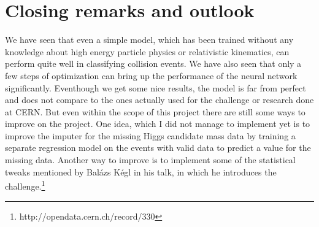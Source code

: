 \section{Closing remarks and outlook}\label{sec:outlook}

We have seen that even a simple model, which has been trained without any knowledge about high energy particle physics or relativistic kinematics, can perform quite well in classifying collision events.
We have also seen that only a few steps of optimization can bring up the performance of the neural network significantly.
Eventhough we get some nice results, the model is far from perfect and does not compare to the ones actually used for the challenge or research done at CERN.
But even within the scope of this project there are still some ways to improve on the project.
One idea, which I did not manage to implement yet is to improve the imputer for the missing Higgs candidate mass data by training a separate regression model on the events with valid data to predict a value for the missing data.
Another way to improve is to implement some of the statistical tweaks mentioned by Balázs Kégl in his talk, in which he introduces the challenge.\footnote{http://opendata.cern.ch/record/330}


